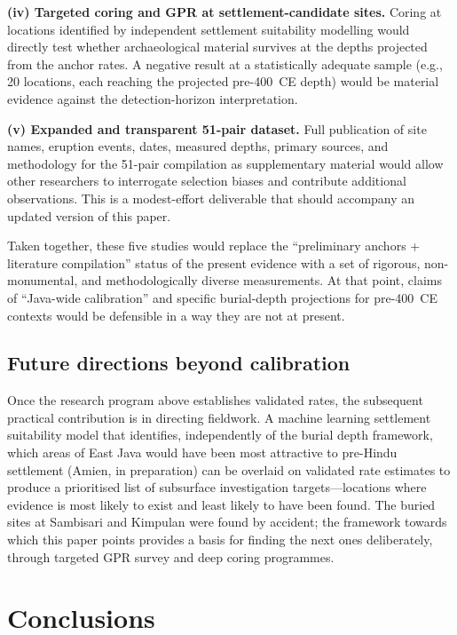 \documentclass[12pt,a4paper]{article}
\begin{document}
\textbf{(iv) Targeted coring and GPR at settlement-candidate sites.} Coring at locations identified by independent settlement suitability modelling \citep[see][]{amien_synthesis_forthcoming} would directly test whether archaeological material survives at the depths projected from the anchor rates. A negative result at a statistically adequate sample (e.g., 20 locations, each reaching the projected pre-400~CE depth) would be material evidence against the detection-horizon interpretation.

\textbf{(v) Expanded and transparent 51-pair dataset.} Full publication of site names, eruption events, dates, measured depths, primary sources, and methodology for the 51-pair compilation as supplementary material would allow other researchers to interrogate selection biases and contribute additional observations. This is a modest-effort deliverable that should accompany an updated version of this paper.

Taken together, these five studies would replace the ``preliminary anchors + literature compilation'' status of the present evidence with a set of rigorous, non-monumental, and methodologically diverse measurements. At that point, claims of ``Java-wide calibration'' and specific burial-depth projections for pre-400~CE contexts would be defensible in a way they are not at present.

\subsection{Future directions beyond calibration}

Once the research program above establishes validated rates, the subsequent practical contribution is in directing fieldwork. A machine learning settlement suitability model that identifies, independently of the burial depth framework, which areas of East Java would have been most attractive to pre-Hindu settlement (Amien, in preparation) can be overlaid on validated rate estimates to produce a prioritised list of subsurface investigation targets---locations where evidence is most likely to exist and least likely to have been found. The buried sites at Sambisari and Kimpulan were found by accident; the framework towards which this paper points provides a basis for finding the next ones deliberately, through targeted GPR survey and deep coring programmes.


\section{Conclusions}
\end{document}
